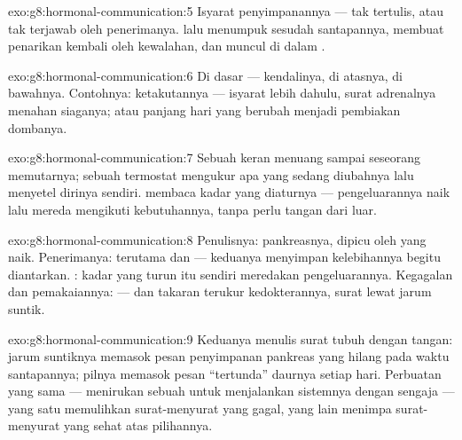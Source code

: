 \begin{solution}{exo:g8:hormonal-communication:5}
Isyarat  penyimpanannya --- tak tertulis, atau tak
terjawab oleh penerimanya.  lalu menumpuk sesudah
santapannya, membuat penarikan kembali oleh 
kewalahan, dan muncul di dalam .
\end{solution}

\begin{solution}{exo:g8:hormonal-communication:6}
Di dasar  ---  kendalinya,  di
atasnya,  di bawahnya. Contohnya: ketakutannya ---
isyarat  lebih dahulu, surat adrenalnya menahan
siaganya; atau panjang hari yang berubah menjadi 
pembiakan dombanya.
\end{solution}

\begin{solution}{exo:g8:hormonal-communication:7}
Sebuah keran menuang sampai seseorang memutarnya; sebuah
termostat mengukur apa yang sedang diubahnya lalu menyetel
dirinya sendiri.  membaca kadar yang diaturnya
--- pengeluarannya naik lalu mereda mengikuti kebutuhannya,
tanpa perlu tangan dari luar.
\end{solution}

\begin{solution}{exo:g8:hormonal-communication:8}
Penulisnya: pankreasnya, dipicu oleh   yang
naik. Penerimanya: terutama  dan  --- keduanya
menyimpan kelebihannya begitu diantarkan. :
kadar yang turun itu sendiri meredakan pengeluarannya.
Kegagalan dan pemakaiannya:  --- dan takaran terukur
kedokterannya, surat lewat jarum suntik.
\end{solution}

\begin{solution}{exo:g8:hormonal-communication:9}
Keduanya menulis surat tubuh dengan tangan: jarum suntiknya
memasok pesan penyimpanan pankreas yang hilang pada waktu
santapannya; pilnya memasok pesan ``tertunda'' daurnya
setiap hari. Perbuatan yang sama --- menirukan sebuah 
untuk menjalankan sistemnya dengan sengaja --- yang satu
memulihkan surat-menyurat yang gagal, yang lain menimpa
surat-menyurat yang sehat atas pilihannya.
\end{solution}

